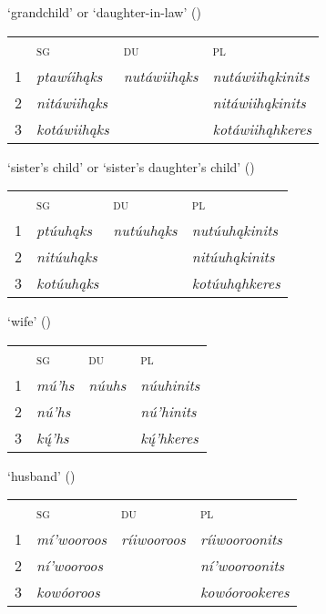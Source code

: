 \begin{exe}
\begin{xlist}
\item\label{ListOfKinshipTerms12} `grandchild' or `daughter-in-law' (\Hermaphrodite)

    \begin{tabular}{llll}
    ~ &\textsc{sg}&\textsc{du}&\textsc{pl}\\
    1&  \textit{ptawíihąks}&   \textit{nutáwiihąks}                                         &\textit{nutáwiihąkinits}\\
    2&  \textit{nitáwiihąks}&    &\textit{nitáwiihąkinits}\\
    3&  \textit{kotáwiihąks}&    &\textit{kotáwiihąhkeres}
    \end{tabular}

\item\label{ListOfKinshipTerms13} `sister's child' or `sister's daughter's child' (\Male)

    \begin{tabular}{llll}
    ~ &\textsc{sg}&\textsc{du}&\textsc{pl}\\
    1&  \textit{ptúuhąks}&   \textit{nutúuhąks}                                         &\textit{nutúuhąkinits}\\
    2&  \textit{nitúuhąks}&    &\textit{nitúuhąkinits}\\
    3&  \textit{kotúuhąks}&    &\textit{kotúuhąhkeres}
    \end{tabular}
    
\item\label{ListOfKinshipTerms14} `wife' (\Hermaphrodite)

    \begin{tabular}{llll}
    ~ &\textsc{sg}&\textsc{du}&\textsc{pl}\\
    1&  \textit{mú'hs}&   \textit{núuhs}                                         &\textit{núuhinits}\\
    2&  \textit{nú'hs}&    &\textit{nú'hinits}\\
    3&  \textit{kų́'hs}&    &\textit{kų́'hkeres}
    \end{tabular}

\item\label{ListOfKinshipTerms15} `husband' (\Hermaphrodite)

    \begin{tabular}{llll}
    ~ &\textsc{sg}&\textsc{du}&\textsc{pl}\\
    1&  \textit{mí'wooroos}&   \textit{ríiwooroos}                                         &\textit{ríiwooroonits}\\
    2&  \textit{ní'wooroos}&    &\textit{ní'wooroonits}\\
    3&  \textit{kowóoroos}&    &\textit{kowóorookeres}
    \end{tabular}


\end{xlist}
\end{exe}
